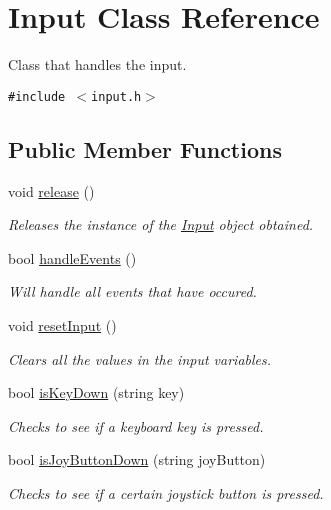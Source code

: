 \hypertarget{class_input}{
\section{Input Class Reference}
\label{class_input}
}
Class that handles the input.  


{\tt \#include $<$input.h$>$}

\subsection*{Public Member Functions}
\begin{CompactItemize}
\item 
void \hyperlink{class_input_689ecae5f4ce62f81fe18386148416c3}{release} ()
\begin{CompactList}\small\item\em Releases the instance of the \hyperlink{class_input}{Input} object obtained. \item\end{CompactList}\item 
bool \hyperlink{class_input_1567bc0d8b690e342e1adbd59916b775}{handleEvents} ()
\begin{CompactList}\small\item\em Will handle all events that have occured. \item\end{CompactList}\item 
void \hyperlink{class_input_d9bf02faaf716bc455388390f4cf25c1}{resetInput} ()
\begin{CompactList}\small\item\em Clears all the values in the input variables. \item\end{CompactList}\item 
bool \hyperlink{class_input_9d9675172f386bb34e1742a6b3abdb69}{isKeyDown} (string key)
\begin{CompactList}\small\item\em Checks to see if a keyboard key is pressed. \item\end{CompactList}\item 
bool \hyperlink{class_input_2ee1202f91bb6461a0d97788cd6b4ba7}{isJoyButtonDown} (string joyButton)
\begin{CompactList}\small\item\em Checks to see if a certain joystick button is pressed. \item\end{CompactList}\item 

\end{CompactItemize}
